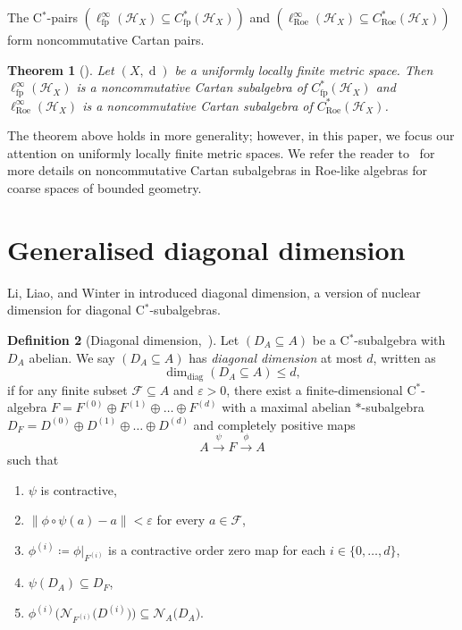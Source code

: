 \documentclass[a4paper]{amsart}
\newcommand{\myhyp}{\textnormal{-}\hskip0pt\relax}
\numberwithin{equation}{section}
\newcommand{\Fcal}{\mathcal{F}}
\newcommand{\Hcal}{\mathcal{H}}
\newcommand{\e}{\varepsilon}
\newcommand{\cstarSub}{C$^\ast$\myhyp{}subalgebra}
\newcommand{\cstarPair}{C$^\ast$\myhyp{}pair}
\newcommand{\Croe}[1]{C^{\ast}_{\mathrm{Roe}}(#1)}
\newcommand{\Cfp}[1]{C^{\ast}_{\mathrm{fp}}({#1})}
\newcommand{\CroeCartan}[1]{\ell^{\infty}_{\mathrm{Roe}}({#1})}
\newcommand{\CfpCartan}[1]{\ell^{\infty}_{\mathrm{fp}}({#1})}
\newcommand{\prn}[1]{{(#1)}}
\DeclareMathOperator{\dist}{d}
\newcommand{\normreg}[1]{{\lVert #1  \rVert}}
\newcommand{\normalisers}[2]{{\mathcal{N}}_{#2}{\big({#1}\big)}}
\newcommand{\ddim}[2]{\dim_{\mathrm{diag}}({#1}\subseteq{#2})}
\theoremstyle{plain}
\newtheorem{thm}{Theorem}[section]
\theoremstyle{indented}
\numberwithin{equation}{section}
\theoremstyle{definition}
\newtheorem{defin}[thm]{Definition}
\theoremstyle{remark}
\theoremstyle{plain}
\theoremstyle{definition}
\begin{document}
The \cstarPair{}s
${(\CfpCartan{\Hcal_X}\subseteq\Cfp{\Hcal_X})}$ and ${(\CroeCartan{\Hcal_X}\subseteq\Croe{\Hcal_X})}$ form noncommutative Cartan 
pairs.

\begin{thm}[{\cite[Theorem 6.32]{MartinezVigolo2023RoeViaMods}}]
    Let ${(X, \dist)}$ be a uniformly locally finite metric space.
    Then ${\CfpCartan{\Hcal_X}}$ is a noncommutative Cartan subalgebra of ${\Cfp{\Hcal_X}}$ and
    ${\CroeCartan{\Hcal_X}}$ is a noncommutative Cartan subalgebra of ${\Croe{\Hcal_X}}$.
\end{thm}

The theorem above holds in more generality; however, in this paper, we focus our attention on uniformly locally finite metric spaces.
We refer the reader to~\cite[Section 6.4.]{MartinezVigolo2023RoeViaMods} for more details on noncommutative Cartan subalgebras in Roe\myhyp{}like algebras for coarse spaces of bounded geometry.

\bigskip\bigskip

\section{Generalised diagonal dimension} \label{section:genDiagDim}

Li, Liao, and Winter in \cite{LiLiaoWinter2023diagDim} introduced diagonal dimension, a version of nuclear dimension for diagonal \cstarSub{}s.

\begin{defin}[{Diagonal dimension,~\cite[Definition~2.1.]{LiLiaoWinter2023diagDim}}] \label{def:diagDim}
    Let ${(D_A \subseteq A)}$ be a C$^{\ast}$\myhyp{}subalgebra with $D_A$ abelian. 
    We say ${(D_A \subseteq A)}$ has \emph{diagonal dimension} at most $d$, written as
    \[\ddim{D_A}{A} \le d,\]
    if for any finite subset ${\Fcal \subseteq A}$ and ${\e > 0}$, 
    there exist a finite\myhyp{}dimensional 
    C$^{\ast}$-algebra ${F=F^{(0)} \oplus F^{(1)} \oplus \hdots \oplus F^{(d)}}$ with a maximal abelian $\ast$\myhyp{}subalgebra \linebreak
    ${D_F=D^{(0)} \oplus D^{(1)} \oplus \hdots \oplus D^{(d)}}$ 
    and completely positive maps 
    \[ A \overset{\psi}{\longrightarrow} F \overset{\phi}{\longrightarrow} A\]
    such that
    \begin{enumerate} \renewcommand{\labelenumi}{(\arabic{enumi})}
        \item $\psi$ is contractive,
        \item ${\normreg{\phi \circ \psi(a) - a } < \e} $ for every $a \in \Fcal$,
        \item ${\phi^{\prn{i}} \coloneq \phi|_{F^{(i)}}}$ is a contractive order zero map for each ${i \in  \{0,\hdots,d\}}$,
        \item ${\psi(D_A) \subseteq D_F}$,
        \item ${\phi^{\prn{i}} \big( \normalisers{D^{(i)}}{F^{(i)}}\big) \subseteq \normalisers{D_A}{A}}$.
    \end{enumerate}
\end{defin}
\end{document}

